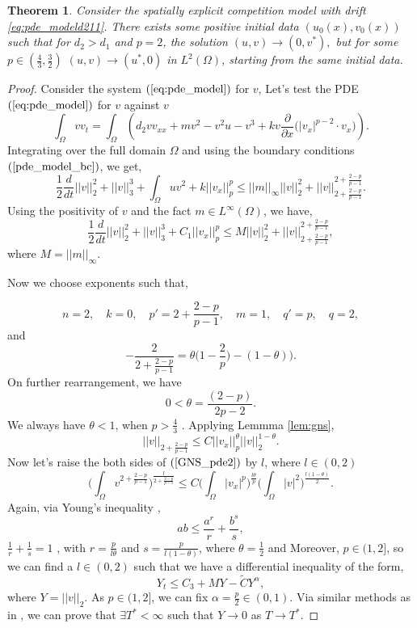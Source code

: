 \documentclass[10pt]{amsart}
\theoremstyle{plain}
\newtheorem{theorem}{Theorem}[section]
\theoremstyle{definition}
\begin{document}
\begin{theorem}
\label{thm:FFTEdd1}
Consider the spatially explicit competition model with drift \eqref{eq:pde_modeld211}.  There exists some positive initial data $(u_0(x),v_0(x))$ such that for $d_2> d_1$ and $p=2$, the solution $(u,v) \to (0,v^{*}),$ but for some $p \in(\frac{4}{3},\frac{3}{2})$  $ (u,v) \to (u^{*},0)$ in $L^{2}(\Omega)$, starting from the same initial data. 
\end{theorem}

\begin{proof}
    Consider the system $(\ref{eq:pde_model})$ for $v$, 
Let's test the PDE $(\ref{eq:pde_model})$ for $v$ against $v$
\[ \int_{\Omega}v v_t =\int_{\Omega}\left( d_2  v v_{xx}  + m v^2 -v^2u-v^3 + k v \dfrac{\partial}{\partial x} \Big(|v_x|^{p-2} \cdot v_x \Big) \right).\]
Integrating over the full domain $\Omega$ and using the boundary conditions $(\ref{pde_model_bc})$, we get,
\[ \dfrac{1}{2} \dfrac{d}{dt} ||v||_2^2 +  ||v||_3^3 + \int_\Omega uv^2 + k ||v_x||_p^p \le ||m||_{\infty}||v||_2^2 + ||v||_{2 + \frac{2-p}{p-1}}^{2 + \frac{2-p}{p-1}} .\]
Using the positivity of $v$ and the fact $m\in L^{\infty} (\Omega)$, we have,
\[ \dfrac{1}{2} \dfrac{d}{dt} ||v||_2^2 +  ||v||_3^3 + C_{1}||v_x||_p^p \le M ||v||_2^2 + ||v||_{2 + \frac{2-p}{p-1}}^{2 + \frac{2-p}{p-1}},\]
where $M=||m||_{\infty}.$

Now we choose exponents such that, 

\[ n=2, \quad  k=0, \quad p'=2 + \frac{2-p}{p-1}, \quad m=1, \quad q'=p, \quad q=2,\]
and
\[ -\dfrac{2}{2+\frac{2-p}{p-1}} = \theta \Big( 1 - \dfrac{2}{p}  \Big) - (1-\theta)).\]
On further rearrangement, we have
\begin{equation}\label{GNS_est}
 0<   \theta = \dfrac{(2-p)}{2p-2}.
\end{equation}
We always have $\theta < 1$, when $p>\frac{4}{3}$ .
Applying Lemmma \ref{lem:gns}, 
\begin{equation}\label{GNS_pde2}
    ||v||_{2+\frac{2-p}{p-1}} \le C ||v_x||^{\theta}_{p} ||v||^{1-\theta}_{2}.
\end{equation}
Now let's raise the both sides of $(\ref{GNS_pde2})$ by $l$, where $l \in (0,2)$
\[ \Big( \int_\Omega v^{2 + \frac{2-p}{p-1}} \Big)^{\frac{l}{2 + \frac{2-p}{p-1}}} \le C \Big( \int_\Omega |v_x|^{p} \Big)^{\frac{l \theta}{\widehat{p}}} \Big( \int_\Omega |v|^2 \Big)^{\frac{l(1-\theta)}{2}}. \]
%
Again, via Young's inequality \cite{evans},
\[ ab \le \dfrac{a^r}{r} + \dfrac{b^s}{s}, \] $\frac{1}{r} + \frac{1}{s}=1$ , with $r = \frac{p}{l \theta}$ and $s=\frac{p}{l(1-\theta)}$, where $\theta = \frac{1}{2}$ and Moreover, $p \in (1,2]$, so we can find a $l \in (0,2)$ such that
we have a differential inequality of the form,
\begin{equation}\label{ODE2}
    Y_t \le C_{3} + MY-\widetilde{C} Y^{\alpha},
\end{equation}
where $Y=||v||_2$. As $p\in (1,2]$, we can fix $\alpha =\frac{p}{2}\in (0,1).$ Via similar methods as in \cite{parshad2021some}, we can prove that $\exists T^*<\infty$ such that $Y \to 0$ as $T \to T^*$.






\end{proof}
\end{document}
